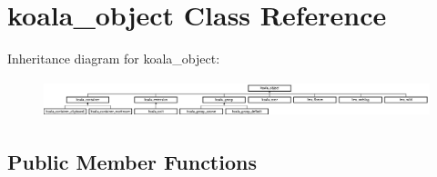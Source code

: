 \hypertarget{classkoala__object}{
\section{koala\_\-object Class Reference}
\label{classkoala__object}
}
Inheritance diagram for koala\_\-object:\begin{figure}[H]
\begin{center}
\leavevmode
\includegraphics[height=1.085271cm]{classkoala__object}
\end{center}
\end{figure}
\subsection*{Public Member Functions}
